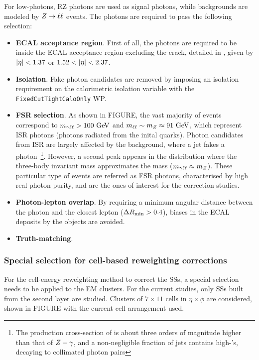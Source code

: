 For low-\pt photons, \ac{RZ} photons are used as signal photons, while backgrounds are modeled by \(Z\rightarrow\ell\ell\) events. The photons are required to pass the following selection:
\begin{itemize}
    \item \textbf{\ac{ECAL} \abseta acceptance region}. First of all, the photons are required to be inside the \ac{ECAL} acceptance region excluding the crack, detailed in \Sect{\ref{subsubsec:atlas:atlas:cals:ecal}}, given by \(|\eta|<1.37\) or \(1.52<\abseta<2.37\). 
    \item \textbf{Isolation}. Fake photon candidates are removed by imposing an isolation requirement on the calorimetric isolation variable with the \texttt{FixedCutTightCaloOnly} \ac{WP}.
    \item \textbf{\ac{FSR} selection}. As shown in FIGURE, the vast majority of events correspond to \(m_{\gamma\ell\ell}>100~\text{GeV}\) and \(m_{\ell\ell}\sim m_{Z} \approx 91~\text{GeV}\), which represent \ac{ISR} photons (photons radiated from the inital quarks). Photon candidates from \ac{ISR} are largely affected by the \Zjets background, where a jet fakes a photon~\footnote{The production cross-section of \Zjets is about three orders of magnitude higher than that of \(Z+\gamma\), and a non-negligible fraction of jets contains high-\pt \pizero's, decaying to collimated photon pairs}.
    However, a second peak appears in the distribution where the three-body invariant mass approximates the \Zboson mass (\(m_{\gamma\ell\ell}\approx m_{Z}\)). These particular type of events are referred as \ac{FSR} photons, characterised by high real photon purity, and are the ones of interest for the correction studies.
    \item \textbf{Photon-lepton overlap}. By requiring a minimum angular distance between the photon and the closest lepton (\(\Delta R_{\text{min}}>0.4\)), biases in the \ac{ECAL} deposits by the objects are avoided.
    \item \textbf{Truth-matching}. 
\end{itemize}


\subsubsection{Special selection for cell-based reweighting corrections}

For the cell-energy reweighting method to correct the \acp{SS}, a special selection needs to be applied to the \ac{EM} clusters. For the current studies, only \acp{SS} built from the second layer are studied. Clusters of \(7\times 11\) cells in \(\eta\times\phi\) are considered, shown in FIGURE with the current cell arrangement used.

